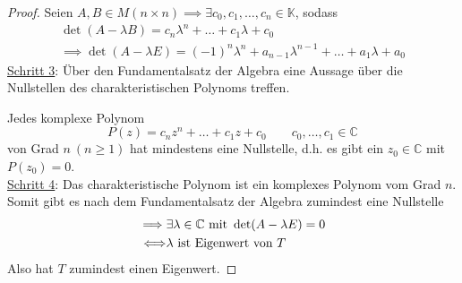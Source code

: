 \begin{proof}
    Seien $A,B\in M(n\times n) \implies \exists c_0, c_1, \dots, c_n\in\mathbb{K}$, sodass
    \begin{gather*}        
        \det(A - \lambda B) = c_n \lambda^n + \dots + c_1 \lambda + c_0\\
        \implies \det (A-\lambda E) = (-1)^n \lambda^n + a_{n-1}\lambda^{n-1} + \dots + a_1 \lambda + a_0
    \end{gather*}
    \underline{Schritt 3}: Über den Fundamentalsatz der Algebra eine Aussage über die Nullstellen des charakteristischen Polynoms treffen.

    Jedes komplexe Polynom
    \[
        P(z) = c_nz^n + \dots + c_1z + c_0\qquad c_0,\dots,c_1\in\mathbb{C}
    \]
    von Grad $n\ (n \geq 1)$ hat mindestens eine Nullstelle, d.h. es gibt ein $z_0\in\mathbb{C}$ mit $P(z_0)=0$.\\
    \underline{Schritt 4}: Das charakteristische Polynom ist ein komplexes Polynom vom Grad $n$. Somit gibt es nach
    dem Fundamentalsatz der Algebra zumindest eine Nullstelle
    \begin{align*}
        \implies& \exists \lambda\in \mathbb{C} \text{ mit } \det(A-\lambda E) = 0\\
        \Longleftrightarrow& \lambda \text{ ist Eigenwert von } T
    \end{align*}
    Also hat $T$ zumindest einen Eigenwert.
\end{proof}